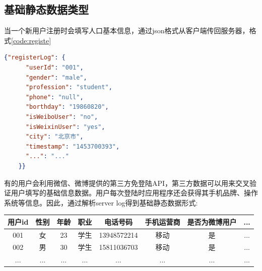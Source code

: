 \subsection{基础静态数据类型}
当一个新用户注册时会填写人口基本信息，通过json格式从客户端传回服务器，格式\autoref{code:registe}
\begin{lstlisting}[language=json,firstnumber=1,label={code:registe}]
    {"registerLog": {
      "userId": "001",
      "gender": "male",
      "profession": "student",
      "phone": "null",
      "borthday": "19860820",
      "isWeiboUser": "no",
      "isWeixinUser": "yes",
      "city": "北京市",
      "timestamp": "1453700393",
      "...": "..."
    }}
\end{lstlisting}
有的用户会利用微信、微博提供的第三方免登陆API，第三方数据可以用来交叉验证用户填写的基础信息数据。用户每次登陆时应用程序还会获得其手机品牌、操作系统等信息。因此，通过解析server log得到基础静态数据形式:
  \begin{table}[htp]
  \centering
  \label{tab:tagweight}
  \begin{tabular}{|c|c|c|c|c|c|c|c|} \hline
   用户id & 性别 & 年龄 & 职业 & 电话号码 & 手机运营商 & 是否为微博用户 & ... \\ \hline
   001 & 女 & 23 & 学生 & 13948572214 & 移动 & 是 & ... \\ \hline
   002 & 男 & 30 & 学生 & 15811036703 & 移动 & 是 & ... \\ \hline
   ... & ... & ... & ... & ... & ... & ... & ... \\ \hline
  \end{tabular}
  \end{table}

